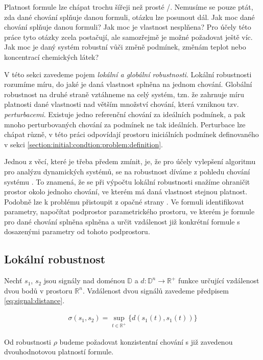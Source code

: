 Platnost formule lze chápat trochu šířeji než prosté /.
Nemusíme se pouze ptát, zda dané chování splňuje danou formuli, otázku lze posunout dál.
Jak moc dané chování splňuje danou formuli? Jak moc je vlastnost nesplňena? Pro účely
této práce tyto otázky zcela postačují, ale samozřejmě je možné požadovat ještě víc.
Jak moc je daný systém robustní vůči změně podmínek, změnám teplot nebo koncentrací
chemických látek?

V této sekci zavedeme pojem \textit{lokální a globální robustnosti}. Lokální robustnosti
rozumíme míru, do jaké je daná vlastnost splněna na jednom chování. Globální robustnost
na druhé straně vztáhneme na celý systém, tzn. že zahrnuje míru platnosti dané vlastnosti
nad větším množství chování, která vzniknou tzv. \textit{perturbacemi}. Existuje jedno
referenční chování za ideálních podmínek, a pak mnoho perturbovaných chování za podmínek
ne tak i\-deál\-ních. Perturbace lze chápat různě, v této práci odpovídají prostoru i\-ni\-ciál\-ních
podmínek definovaného v sekci \ref{section:initial:condtion:problem:definition}. 

Jednou z věcí, které je třeba předem zmínit, je, že pro účely vylepšení algoritmu pro
analýzu dynamických systémů, se na robustnost díváme z pohledu chování systému \cite{donze2011}.
To znamená, že se při výpočtu lokální robustnosti snažíme ohraničit prostor okolo jednoho chování,
ve kterém má daná vlastnost stejnou platnost. Podobně lze k problému přistoupit z opačné strany \cite{rizk2009}.
Ve formuli identifikovat parametry, napočítat podprostor parametrického prostoru, ve kterém je formule
pro dané chování splněna splněna a určit vzdálenost již konkrétní formule s dosazenými parametry
od tohoto podprostoru.

\subsection{Lokální robustnost}

Nechť $s_1$, $s_2$ jsou signály nad doménou $\mathbb{D}$ a $d: \mathbb{D}^n \rightarrow \mathbb{R}^{+}$
funkce určující vzdálenost dvou bodů v prostoru $\mathbb{R}^n$. 
Vzdálenost dvou signálů zavedeme předpisem \ref{eq:signal:distance}.

\begin{align}\label{eq:signal:distance}
\sigma(s_1, s_2) = {\displaystyle \sup_{t \in \mathbb{R}^{+}}} \{d(s_1(t), s_1(t))\}
\end{align}

Od robustnosti $\rho$ budeme požadovat konzistentní chování s již zavedenou dvouhodnotovou platností
formule. 

